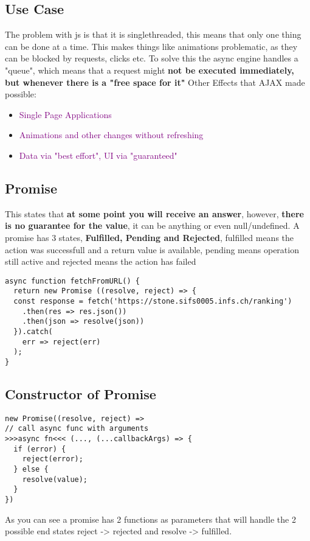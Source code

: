 \documentclass[main.tex,fontsize=6pt,paper=a4,paper=landscape,DIV=calc,]{scrartcl}
\begin{document}
\begin{multicols*}{4}
\subsection{Use Case}  
The problem with js is that it is singlethreaded, this means that only one thing can be done at a time.\newline
This makes things like animations problematic, as they can be blocked by requests, clicks etc.\newline
To solve this the async engine handles a "queue", which means that a request might \textbf{not be executed immediately, but whenever there is a "free space for it"}\newline
Other Effects that AJAX made possible:
\begin{itemize}
\item \textcolor{purple}{Single Page Applications}
\item \textcolor{purple}{Animations and other changes without refreshing}
\item \textcolor{purple}{Data via "best effort", UI via "guaranteed"}
\end{itemize} 

\subsection{Promise}  
This states that \textbf{at some point you will receive an answer}, however, \textbf{there is no guarantee for the value}, it can be anything or even null/undefined.\newline
\textcolor{OliveGreen}{A promise has 3 states, \textbf{Fulfilled, Pending and Rejected}, fulfilled means the action was successfull and a return value is available, pending means operation still active and rejected means the action has failed}
\vspace{-2mm}
\begin{lstlisting}
async function fetchFromURL() {
  return new Promise ((resolve, reject) => {
  const response = fetch('https://stone.sifs0005.infs.ch/ranking')
    .then(res => res.json())
    .then(json => resolve(json))
  }).catch(
    err => reject(err)
  );
}
\end{lstlisting}
\vspace{2mm}

\subsection{Constructor of Promise}  
\vspace{-2mm}
\begin{lstlisting}
new Promise((resolve, reject) =>
// call async func with arguments
>>>async fn<<< (..., (...callbackArgs) => {
  if (error) {
    reject(error);
  } else {
    resolve(value);
  }
})
\end{lstlisting}
\vspace{2mm}
As you can see a promise has 2 functions as parameters that will handle the 2 possible end states reject -> rejected and resolve -> fulfilled.


\end{multicols*}
\end{document}
